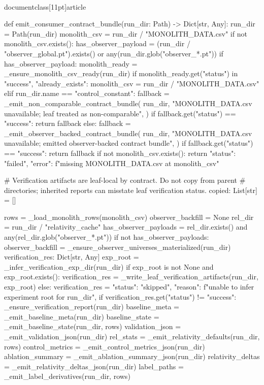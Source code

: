 \\documentclass[11pt]{article}
\begin{document}
\begin{CodeBlock}
def emit_consumer_contract_bundle(run_dir: Path) -> Dict[str, Any]:
    run_dir = Path(run_dir)
    monolith_csv = run_dir / "MONOLITH_DATA.csv"
    if not monolith_csv.exists():
        has_observer_payload = (run_dir / "observer_global.pt").exists() or any(run_dir.glob("observer_*.pt"))
        if has_observer_payload:
            monolith_ready = _ensure_monolith_csv_ready(run_dir)
            if monolith_ready.get("status") in {"success", "already_exists"}:
                monolith_csv = run_dir / "MONOLITH_DATA.csv"
            elif run_dir.name == "control_constant":
                fallback = _emit_non_comparable_contract_bundle(
                    run_dir,
                    "MONOLITH_DATA.csv unavailable; leaf treated as non-comparable",
                )
                if fallback.get("status") == "success":
                    return fallback
            else:
                fallback = _emit_observer_backed_contract_bundle(
                    run_dir,
                    "MONOLITH_DATA.csv unavailable; emitted observer-backed contract bundle",
                )
                if fallback.get("status") == "success":
                    return fallback
        if not monolith_csv.exists():
            return {"status": "failed", "error": f"missing MONOLITH_DATA.csv at {monolith_csv}"}

    # Verification artifacts are leaf-local by contract. Do not copy from parent
    # directories; inherited reports can misstate leaf verification status.
    copied: List[str] = []

    rows = _load_monolith_rows(monolith_csv)
    observer_backfill = None
    rel_dir = run_dir / "relativity_cache"
    has_observer_payloads = rel_dir.exists() and any(rel_dir.glob("observer_*.pt"))
    if not has_observer_payloads:
        observer_backfill = _ensure_observer_universes_materialized(run_dir)
    verification_res: Dict[str, Any]
    exp_root = _infer_verification_exp_dir(run_dir)
    if exp_root is not None and exp_root.exists():
        verification_res = _write_leaf_verification_artifacts(run_dir, exp_root)
    else:
        verification_res = {
            "status": "skipped",
            "reason": f"unable to infer experiment root for {run_dir}",
        }
    if verification_res.get("status") != "success":
        _ensure_verification_report(run_dir)
    baseline_meta = _emit_baseline_meta(run_dir)
    baseline_state = _emit_baseline_state(run_dir, rows)
    validation_json = _emit_validation_json(run_dir)
    rel_stats = _emit_relativity_defaults(run_dir, rows)
    control_metrics = _emit_control_metrics_json(run_dir)
    ablation_summary = _emit_ablation_summary_json(run_dir)
    relativity_deltas = _emit_relativity_deltas_json(run_dir)
    label_paths = _emit_label_derivatives(run_dir, rows)


\end{CodeBlock}
\end{document}
